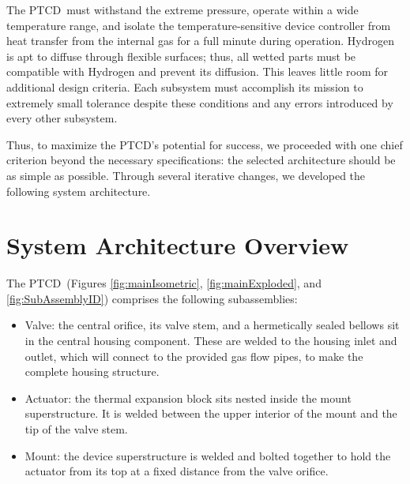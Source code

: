 \documentclass[12pt, letterpaper]{report}%
\newcounter{mycounter}           %
\newcounter{sub}[mycounter]      %
\newcommand{\device}{PTCD}
\begin{document}
        The \device\ must withstand the extreme pressure, operate within a wide temperature range, 
        and isolate the temperature-sensitive device controller
        from heat transfer from the internal gas for a full minute during operation.
        Hydrogen is apt to diffuse through flexible surfaces; thus, all wetted parts must be compatible with Hydrogen and prevent its diffusion.
        This leaves little room for additional design criteria. Each subsystem must accomplish its mission to extremely small tolerance
        despite these conditions and any errors introduced by every other subsystem.
        
        Thus, to maximize the \device 's potential for success, we proceeded with one chief criterion beyond the necessary specifications:
        the selected architecture should be as simple as possible. Through several iterative changes,
        we developed the following system architecture.

    \section{System Architecture Overview}
    \label{sec:sys_arch_overview}
        
        The \device\ (Figures \ref{fig:mainIsometric}, \ref{fig:mainExploded}, and \ref{fig:SubAssemblyID})
        comprises the following subassemblies:

        \begin{itemize}
            \item Valve: the central orifice, its valve stem, and a hermetically sealed bellows sit in the central housing component.
                    These are welded to the housing inlet and outlet, which will connect to the provided gas flow pipes, to make the complete housing structure.
            \item Actuator: the thermal expansion block sits nested inside the mount superstructure. 
                    It is welded between the upper interior of the mount and the tip of the valve stem.
            \item Mount: the device superstructure is welded and bolted together to hold the actuator from its top at a fixed distance from the valve orifice.
        \end{itemize}
       
       
\end{document}
